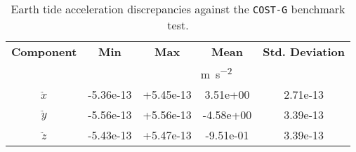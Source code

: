 \begin{table}[]
  \centering
  \begin{tabular}{ccccc}
      \textbf{Component} & \textbf{Min} & \textbf{Max} & \textbf{Mean} & \textbf{Std. Deviation}\\
      & \multicolumn{4}{c}{\si{\metre\per\square\second}} \\
      \hline
      $\ddot{x}$ & -5.36e-13 & +5.45e-13 &  3.51e+00 & 2.71e-13 \\
      $\ddot{y}$ & -5.56e-13 & +5.56e-13 & -4.58e+00 & 3.39e-13 \\
      $\ddot{z}$ & -5.43e-13 & +5.47e-13 & -9.51e-01 & 3.39e-13 \\
      \hline
  \end{tabular}
  \caption{Earth tide acceleration discrepancies against the \texttt{COST-G} benchmark test.}
  \label{table:costg-benchmark-04solidEarthTide-icrf}
\end{table}
